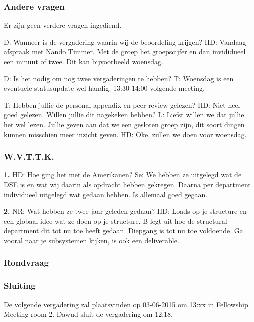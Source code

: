 \subsubsection{Andere vragen}
Er zijn geen verdere vragen ingediend.

D: Wanneer is de vergadering waarin wij de beoordeling krijgen?
HD: Vandaag afspraak met Nando Timmer. Met de groep het groepscijfer en dan invididueel een minuut of twee. Dit kan bijvoorbeeld woensdag.

D: Is het nodig om nog twee vergaderingen te hebben?
T: Woensdag is een eventuele statusupdate wel handig.
13:30-14:00 volgende meeting.

T: Hebben jullie de personal appendix en peer review gelezen?
HD: Niet heel goed gelezen. Willen jullie dit nagekeken hebben?
L: Liefst willen we dat jullie het wel lezen. Jullie geven aan dat we een gesloten groep zijn, dit soort dingen kunnen misschien meer inzicht geven.
HD: Oke, zullen we doen voor woensdag.

\subsubsection{W.V.T.T.K.}
\textbf{1.} HD: Hoe ging het met de Amerikanen? 
Se: We hebben ze uitgelegd wat de DSE is en wat wij daarin als opdracht hebben gekregen. Daarna per department individueel uitgelegd wat gedaan hebben. Is allemaal goed gegaan.

\textbf{2.} NR: Wat hebben ze twee jaar geleden gedaan? HD: Loads op je structure en een globaal idee wat ze doen op je structure. B legt uit hoe de structural department dit tot nu toe heeft gedaan. Diepgang is tot nu toe voldoende. Ga vooral naar je subsystemen kijken, is ook een deliverable.

\subsubsection{Rondvraag}


\subsubsection{Sluiting}
De volgende vergadering zal plaatsvinden op 03-06-2015 om 13:xx in Fellowship Meeting room 2.
\newline\newline
Dawud sluit de vergadering om 12:18.
